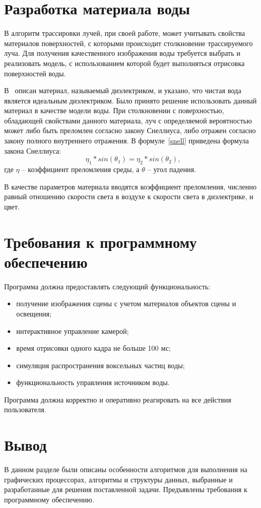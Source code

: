 \section{Разработка материала воды}

В алгоритм трассировки лучей, при своей работе, может учитывать 
свойства материалов поверхностей, с которыми происходит столкновение 
трассируемого луча. Для получения качественного изображения воды требуется выбрать 
и реализовать модель, с использованием которой будет выполняться отрисовка 
поверхностей воды.

В~\cite{RTW} описан материал, называемый диэлектриком, и указано, что
чистая вода является идеальным диэлектриком. Было принято решение использовать
данный материал в качестве модели воды. При столкновении с поверхностью, обладающей
свойствами данного материала, луч с определяемой вероятностью может
либо быть преломлен согласно закону Снеллиуса, либо отражен согласно закону 
полного внутреннего отражения. В формуле~\ref{snell} приведена формула закона
Снеллиуса:
\begin{equation}
    \label{snell}
    \eta_1 * sin(\theta_1) = \eta_2 * sin(\theta_2),
\end{equation}
где $\eta$ -- коэффициент преломления среды, а $\theta$ -- угол падения. 

В качестве параметров материала вводятся коэффициент преломления, численно равный 
отношению скорости света в воздухе к скорости света в диэлектрике, и цвет. 

\section{Требования к программному обеспечению}

Программа должна предоставлять следующий функциональность:
\begin{itemize}
    \item получение изображения сцены с учетом материалов объектов сцены и освещения;
    \item интерактивное управление камерой;
    \item время отрисовки одного кадра не больше 100 мс;
    \item симуляция распространения воксельных частиц воды;
    \item функциональность управления источником воды.
\end{itemize}

Программа должна корректно и оперативно реагировать на все действия пользователя.

\section*{Вывод}

В данном разделе были описаны особенности алгоритмов для выполнения
на графических процессорах, алгоритмы и структуры данных, выбранные 
и разработанные для решения поставленной задачи. Предъявлены требования 
к программному обеспечению.
